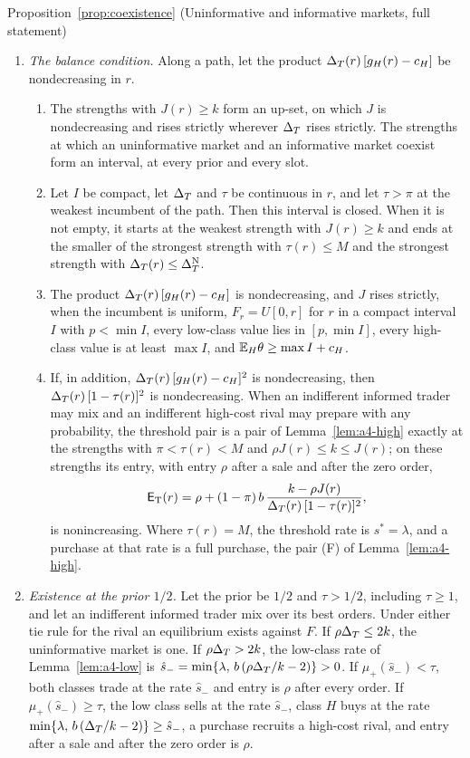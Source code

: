 \begin{named}{Proposition~\ref{prop:coexistence} (Uninformative and informative markets, full statement)}
\begin{enumerate}[label=(\alph*),leftmargin=2em]
\(r\), with \(r'<r<r''\), then \(\DT(r)<\DT^{\rm F}\): a gap lies at spreads too narrow for a sure purchase to pay.
\item \emph{The balance condition.} Along a path, let the product \(\Delta_T(r)\,[g_H(r)-c_H]\) be nondecreasing in \(r\).
\begin{enumerate}[label=(\roman*),leftmargin=2em]
\item The strengths with \(J(r)\ge k\) form an up-set, on which \(J\) is nondecreasing and rises strictly wherever
\(\Delta_T\) rises strictly. The strengths at which an uninformative market and an informative market coexist form an interval,
at every prior and every slot.
\item Let \(I\) be compact, let \(\Delta_T\) and \(\tau\) be continuous in \(r\), and let \(\tau>\pi\) at the weakest
incumbent of the path. Then this interval is closed. When it is not empty, it starts at the weakest strength with
\(J(r)\ge k\) and ends at the smaller of the strongest strength with \(\tau(r)\le M\) and the strongest strength with
\(\Delta_T(r)\le\Delta_T^{\rm N}\).
\item The product \(\Delta_T(r)\,[g_H(r)-c_H]\) is nondecreasing, and \(J\) rises strictly, when the incumbent is uniform,
\(F_r=U[0,r]\) for \(r\) in a compact interval \(I\) with \(p<\min I\), every low-class value lies in
\([p,\min I]\), every high-class value is at least \(\max I\), and \(\mathbb{E}_H\theta\ge\max I+c_H\).
\item If, in addition, \(\Delta_T(r)\,[g_H(r)-c_H]^2\) is nondecreasing, then \(\Delta_T(r)\,[1-\tau(r)]^2\) is nondecreasing.
When an indifferent informed trader may mix and an indifferent high-cost rival may prepare with any probability, the
threshold pair is a pair of Lemma~\ref{lem:a4-high} exactly at the strengths with \(\pi<\tau(r)<M\) and
\(\rho J(r)\le k\le J(r)\); on these strengths its entry, with entry \(\rho\) after a sale and after the zero order,
\[
\mathsf{E}_{\rm T}(r)=\rho+(1-\pi)\,b\,\frac{k-\rho J(r)}{\Delta_T(r)\,[1-\tau(r)]^2},
\]
is nonincreasing. Where \(\tau(r)=M\), the threshold rate is \(s^*=\lambda\), and a purchase at that rate is a full
purchase, the pair (F) of Lemma~\ref{lem:a4-high}.
\end{enumerate}
\item \emph{Existence at the prior \(1/2\).} Let the prior be \(1/2\) and \(\tau>1/2\), including \(\tau\ge1\), and let an
indifferent informed trader mix over its best orders. Under either tie rule for the rival an equilibrium exists against \(F\). If
\(\rho\Delta_T\le2k\), the uninformative market is one. If \(\rho\Delta_T>2k\), the low-class rate of Lemma~\ref{lem:a4-low} is
\(\hat s_-=\min\{\lambda,\,b\,(\rho\Delta_T/k-2)\}>0\). If \(\mu_+(\hat s_-)<\tau\), both classes trade at the rate
\(\hat s_-\) and entry is \(\rho\) after every order. If \(\mu_+(\hat s_-)\ge\tau\), the low class sells at the rate
\(\hat s_-\), class \(H\) buys at the rate \(\min\{\lambda,\,b\,(\Delta_T/k-2)\}\ge\hat s_-\), a purchase recruits a
high-cost rival, and entry after a sale and after the zero order is \(\rho\).
\end{enumerate}
\end{named}

